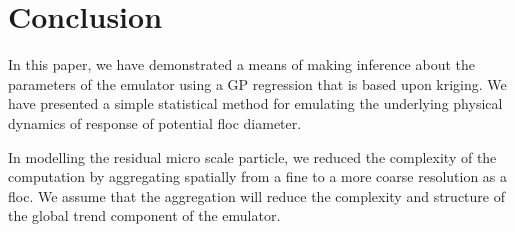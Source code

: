 
\section{Conclusion}
In this paper, we have demonstrated a means of making inference about the parameters of the emulator using a GP regression that is based upon kriging. We have presented a simple statistical method for emulating the underlying physical dynamics of response of potential floc diameter. %

In modelling the residual micro scale particle, we reduced the complexity of the computation by aggregating spatially from a fine to a more coarse resolution as a floc. We assume that the aggregation will reduce the complexity and structure of the global trend component of the emulator. %
 




